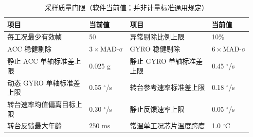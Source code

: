\begin{table}[H]\centering\small
\caption{采样质量门限（软件当前值；并非计量标准通用规定）}
\noindent\begin{tabularx}{\linewidth}{@{}Yp{32mm}Yp{32mm}@{}}\toprule
项目 & 当前值 & 项目 & 当前值\\\midrule
每工况最少有效帧 & 50 & 异常剔除比例上限 & 10\%\\
ACC 稳健剔除 & $3\times\mathrm{MAD\mbox{-}\sigma}$ & GYRO 稳健剔除 & $6\times\mathrm{MAD\mbox{-}\sigma}$\\
静止 ACC 单轴标准差上限 & 0.025 g & 静止 GYRO 单轴标准差上限 & 0.45 $^\circ$/s\\
动态 GYRO 单轴标准差上限 & 0.55 $^\circ$/s & 转台参考速率标准差上限 & 0.18 $^\circ$/s\\
转台速率均值偏离目标上限 & 0.30 $^\circ$/s & 静止反馈速率上限 & 0.05 $^\circ$/s\\
转台反馈最大年龄 & 250 ms & 常温单工况芯片温度跨度 & 1.0 $^\circ$C\\\bottomrule\end{tabularx}\end{table}

